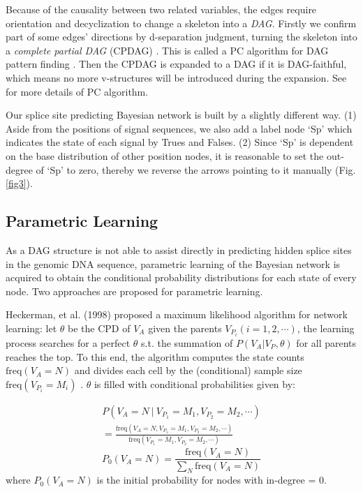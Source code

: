 \documentclass[journal,twoside]{IEEEtran}
\begin{document}
Because of the causality between two related variables, the edges require orientation and decyclization to change a skeleton into a \textsl{DAG}. Firstly we confirm part of some edges' directions by d-separation judgment, turning the skeleton into a \textsl{complete partial DAG} (CPDAG) \cite{kalisch2007estimating}. This is called a PC algorithm for DAG pattern finding  \cite{spirtes1991algorithm}\cite{neapolitan2004learning}. Then the CPDAG is expanded to a DAG if it is DAG-faithful, which means no more v-structures will be introduced during the expansion. See \cite{neapolitan2004learning} for more details of PC algorithm. 

Our splice site predicting Bayesian network is built by a slightly different way. (1) Aside from the positions of signal sequences, we also add a label node `Sp' which indicates the state of each signal by Trues and Falses. (2) Since `Sp' is dependent on the base distribution of other position nodes, it is reasonable to set the out-degree of `Sp' to zero, thereby we reverse the arrows pointing to it manually (Fig. \ref{fig3}). 

\subsection{Parametric Learning}\label{2.4}

As a DAG structure is not able to assist directly in predicting hidden splice sites in the genomic DNA sequence, parametric learning of the Bayesian network is acquired to obtain the conditional probability distributions for each state of every node. Two approaches are proposed for parametric learning. 

Heckerman, et al. (1998) \cite{heckerman2008tutorial} proposed a maximum likelihood algorithm for network learning: let $\theta$ be the CPD of $V_A$ given the parents $V_{P_i} (i = 1, 2, \cdots)$, the learning process searches for a perfect $\theta$ s.t. the summation of $P(V_A | V_P, \theta)$ for all parents reaches the top. To this end, the algorithm computes the state counts $\text{freq}(V_A = N)$ and divides each cell by the (conditional) sample size $\text{freq}(V_{P_i} = M_i)$ \cite{koller2009probabilistic}. $\theta$ is filled with conditional probabilities given by:

\begin{multline}
P(V_A = N \ | \ V_{P_1} = M_1, V_{P_2} = M_2, \cdots) \\
= \displaystyle\frac{\text{freq}(V_A = N, V_{P_1} = M_1, V_{P_2} = M_2, \cdots)}{\text{freq}(V_{P_1} = M_1, V_{P_2} = M_2, \cdots)}
\label{eq1}
\end{multline}
\begin{equation}
P_0(V_A = N) = \displaystyle\frac{\text{freq}(V_A = N)}{\sum\limits_N \text{freq}(V_A = N)}
\label{eq2}
\end{equation}
where $P_0(V_A = N)$ is the initial probability for nodes with in-degree = 0. 
\end{document}
